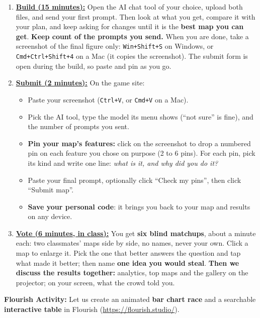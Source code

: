 \documentclass[letterpaper,addpoints, 11pt]{exam}
\begin{document}
\begin{questions}
\begin{enumerate}[label=(\Alph*)]
	\item \underline{\textbf{Build (15 minutes):}} Open the AI chat tool of your choice, upload both files, and send your first prompt. Then look at what you get, compare it with your plan, and keep asking for changes until it is the \textbf{best map you can get}. \textbf{Keep count of the prompts you send.} When you are done, take a screenshot of the final figure only: \texttt{Win+Shift+S} on Windows, or \texttt{Cmd+Ctrl+Shift+4} on a Mac (it copies the screenshot). The submit form is open during the build, so paste and pin as you go.

	\item \underline{\textbf{Submit (2 minutes):}} On the game site:
	\begin{itemize}[nosep]
		\item Paste your screenshot (\texttt{Ctrl+V}, or \texttt{Cmd+V} on a Mac).
		\item Pick the AI tool, type the model its menu shows (``not sure'' is fine), and the number of prompts you sent.
		\item \textbf{Pin your map's features:} click on the screenshot to drop a numbered pin on each feature you chose on purpose (2 to 6 pins). For each pin, pick its kind and write one line: \textit{what is it, and why did you do it?}
		\item Paste your final prompt, optionally click ``Check my pins'', then click ``Submit map''.
		\item \textbf{Save your personal code}: it brings you back to your map and results on any device.
	\end{itemize}

	\item \underline{\textbf{Vote (6 minutes, in class):}} You get \textbf{six blind matchups}, about a minute each: two classmates' maps side by side, no names, never your own. Click a map to enlarge it. Pick the one that better answers the question and tap what made it better; then name \textbf{one idea you would steal}. \textbf{Then we discuss the results together:} analytics, top maps and the gallery on the projector; on your screen, what the crowd told you.
\end{enumerate}

\newpage

\question[0] \textbf{Flourish Activity:} Let us create an animated \textbf{bar chart race} and a searchable \textbf{interactive table} in Flourish (\url{https://flourish.studio/}).


\end{questions}
\end{document}
